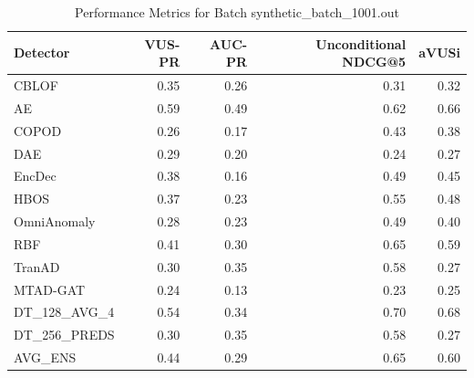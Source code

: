 \begin{table}
\centering
\caption{Performance Metrics for Batch synthetic_batch_1001.out}
\label{tab:example_metrics}
\begin{tabular}{lrrrr}
\toprule
    Detector &  VUS-PR &  AUC-PR &  Unconditional NDCG@5 &  aVUSi \\
\midrule
       CBLOF &    0.35 &    0.26 &                  0.31 &   0.32 \\
          AE &    0.59 &    0.49 &                  0.62 &   0.66 \\
       COPOD &    0.26 &    0.17 &                  0.43 &   0.38 \\
         DAE &    0.29 &    0.20 &                  0.24 &   0.27 \\
      EncDec &    0.38 &    0.16 &                  0.49 &   0.45 \\
        HBOS &    0.37 &    0.23 &                  0.55 &   0.48 \\
 OmniAnomaly &    0.28 &    0.23 &                  0.49 &   0.40 \\
         RBF &    0.41 &    0.30 &                  0.65 &   0.59 \\
      TranAD &    0.30 &    0.35 &                  0.58 &   0.27 \\
    MTAD-GAT &    0.24 &    0.13 &                  0.23 &   0.25 \\
DT\_128\_AVG\_4 &    0.54 &    0.34 &                  0.70 &   0.68 \\
DT\_256\_PREDS &    0.30 &    0.35 &                  0.58 &   0.27 \\
     AVG\_ENS &    0.44 &    0.29 &                  0.65 &   0.60 \\
\bottomrule
\end{tabular}
\end{table}
